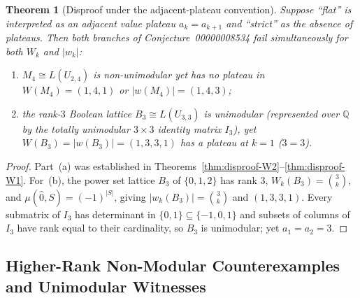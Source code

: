 \documentclass[11pt]{article}
\newtheorem{theorem}{Theorem}[section]
\theoremstyle{definition}
\theoremstyle{remark}
\newcommand{\Q}{\mathbb{Q}}
\begin{document}
\begin{theorem}[Disproof under the adjacent-plateau convention]
\label{thm:plateau}
Suppose ``flat'' is interpreted as an adjacent value plateau $a_k = a_{k+1}$ and ``strict'' as the
absence of plateaus. Then both branches of Conjecture~00000008534 fail simultaneously for both
$W_k$ and $|w_k|$:
\begin{enumerate}
  \item[(a)] $M_4 \cong L(U_{2,4})$ is non-unimodular yet has no plateau in $W(M_4) = (1, 4, 1)$ or
    $|w(M_4)| = (1, 4, 3)$;
  \item[(b)] the rank-$3$ Boolean lattice $B_3 \cong L(U_{3,3})$ is unimodular (represented over $\Q$
    by the totally unimodular $3 \times 3$ identity matrix $I_3$), yet
    $W(B_3) = |w(B_3)| = (1, 3, 3, 1)$ has a plateau at $k = 1$ ($3 = 3$).
\end{enumerate}
\end{theorem}

\begin{proof}
Part~(a) was established in Theorems~\ref{thm:disproof-W2}--\ref{thm:disproof-W1}. For~(b), the
power set lattice $B_3$ of $\{0, 1, 2\}$ has rank $3$, $W_k(B_3) = \binom{3}{k}$, and
$\mu(\hat{0}, S) = (-1)^{|S|}$, giving $|w_k(B_3)| = \binom{3}{k}$ and $(1, 3, 3, 1)$. Every
submatrix of $I_3$ has determinant in $\{0, 1\} \subseteq \{-1, 0, 1\}$ and subsets of columns of
$I_3$ have rank equal to their cardinality, so $B_3$ is unimodular; yet $a_1 = a_2 = 3$.
\end{proof}

\subsection{Higher-Rank Non-Modular Counterexamples and Unimodular Witnesses}
\end{document}

